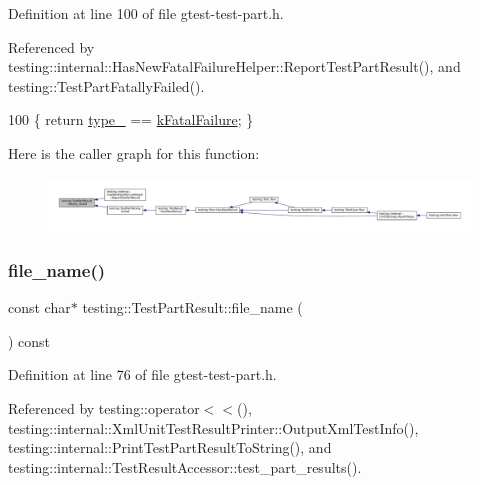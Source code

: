 Definition at line 100 of file gtest-\/test-\/part.\+h.



Referenced by testing\+::internal\+::\+Has\+New\+Fatal\+Failure\+Helper\+::\+Report\+Test\+Part\+Result(), and testing\+::\+Test\+Part\+Fatally\+Failed().


\begin{DoxyCode}
100 \{ \textcolor{keywordflow}{return} \hyperlink{classtesting_1_1TestPartResult_a4ee7ac490fe4f10e222fa08c3fa25437}{type\_} == \hyperlink{classtesting_1_1TestPartResult_a65ae656b33fdfdfffaf34858778a52d5ae1bf0b610b697a43fee97628cdab4ea1}{kFatalFailure}; \}
\end{DoxyCode}
Here is the caller graph for this function\+:
\nopagebreak
\begin{figure}[H]
\begin{center}
\leavevmode
\includegraphics[width=350pt]{classtesting_1_1TestPartResult_a77db157eff9531c3c00c2420502f9a89_icgraph}
\end{center}
\end{figure}
\mbox{\label{classtesting_1_1TestPartResult_a0be40512f50a0086c4d3dc43938978aa}} 
\subsubsection{\texorpdfstring{file\+\_\+name()}{file\_name()}}
{\footnotesize\ttfamily const char$\ast$ testing\+::\+Test\+Part\+Result\+::file\+\_\+name (\begin{DoxyParamCaption}{ }\end{DoxyParamCaption}) const\hspace{0.3cm}{\ttfamily [inline]}}



Definition at line 76 of file gtest-\/test-\/part.\+h.



Referenced by testing\+::operator$<$$<$(), testing\+::internal\+::\+Xml\+Unit\+Test\+Result\+Printer\+::\+Output\+Xml\+Test\+Info(), testing\+::internal\+::\+Print\+Test\+Part\+Result\+To\+String(), and testing\+::internal\+::\+Test\+Result\+Accessor\+::test\+\_\+part\+\_\+results().


